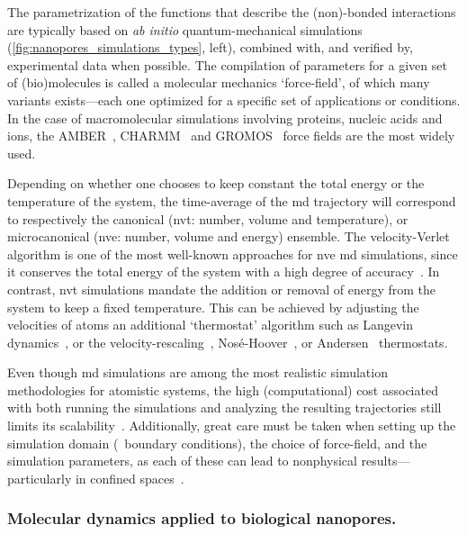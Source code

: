 The parametrization of the functions that describe the (non)-bonded interactions are typically based on
\textit{ab initio} quantum-mechanical simulations (\cref{fig:nanopores_simulations_types}, left), combined
with, and verified by, experimental data when possible. The compilation of parameters for a given set of
(bio)molecules is called a molecular mechanics `force-field', of which many variants exists---each one
optimized for a specific set of applications or conditions. In the case of macromolecular simulations
involving proteins, nucleic acids and ions, the {AMBER}~\cite{Ponder-2003}, {CHARMM}~\cite{Huang-2016} and
{GROMOS}~\cite{Oostenbrink-2004} force fields are the most widely used.

Depending on whether one chooses to keep constant the total energy or the temperature of the system, the
time-average of the \gls{md} trajectory will correspond to respectively the canonical (\gls{nvt}: number,
volume and temperature), or microcanonical (\gls{nve}: number, volume and energy) ensemble. The
velocity-Verlet algorithm is one of the most well-known approaches for \gls{nve} \gls{md} simulations, since
it conserves the total energy of the system with a high degree of accuracy~\cite{Swope-1982}. In contrast,
\gls{nvt} simulations mandate the addition or removal of energy from the system to keep a fixed temperature.
This can be achieved by adjusting the velocities of atoms an additional `thermostat' algorithm such as
Langevin dynamics~\cite{Bussi-2008}, or the velocity-rescaling~\cite{Heyes-1983},
Nos\'{e}-Hoover~\cite{Nose-1984,Hoover-1985}, or Andersen~\cite{Andersen-1980} thermostats.

Even though \gls{md} simulations are among the most realistic simulation methodologies for atomistic
systems, the high (computational) cost associated with both running the simulations and analyzing the
resulting trajectories still limits its scalability~\cite{Vendruscolo-2011,Phillips-2020}. Additionally, great
care must be taken when setting up the simulation domain (\ie~boundary conditions), the choice of force-field,
and the simulation parameters, as each of these can lead to nonphysical results---particularly in confined
spaces~\cite{Wong-ekkabut-2016a}.


\subsubsection{Molecular dynamics applied to biological nanopores.}
%

